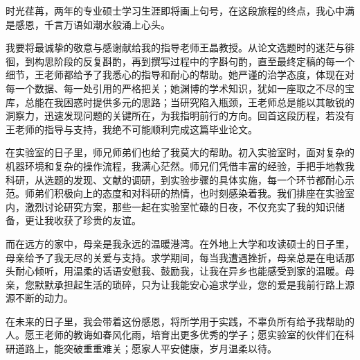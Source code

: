 \begin{acknowledge}%
时光荏苒，两年的专业硕士学习生涯即将画上句号，在这段旅程的终点，我心中满是感恩，千言万语如潮水般涌上心头。

我要将最诚挚的敬意与感谢献给我的指导老师王晶教授。从论文选题时的迷茫与徘徊，到构思阶段的反复斟酌，再到撰写过程中的字斟句酌，直至最终定稿的每一个细节，王老师都给予了我悉心的指导和耐心的帮助。她严谨的治学态度，体现在对每一个数据、每一处引用的严格把关；她渊博的学术知识，犹如一座取之不尽的宝库，总能在我困惑时提供多元的思路；当研究陷入瓶颈，王老师总是能以其敏锐的洞察力，迅速发现问题的关键所在，为我指明前行的方向。回首这段历程，若没有王老师的指导与支持，我绝不可能顺利完成这篇毕业论文。

在实验室的日子里，师兄师弟们也给了我莫大的帮助。初入实验室时，面对复杂的机器环境和复杂的操作流程，我满心茫然。师兄们凭借丰富的经验，手把手地教我科研，从选题的发现、文献的调研，到实验步骤的具体实施，每一个环节都耐心示范。师弟们积极向上的态度和对科研的热情，也时刻感染着我。我们排座在实验室内，激烈讨论研究方案，那些一起在实验室忙碌的日夜，不仅充实了我的知识储备，更让我收获了珍贵的友谊。

而在远方的家中，母亲是我永远的温暖港湾。在外地上大学和攻读硕士的日子里，母亲给予了我无尽的关爱与支持。求学期间，每当我遭遇挫折，母亲总是在电话那头耐心倾听，用温柔的话语安慰我、鼓励我，让我在异乡也能感受到家的温暖。母亲，您默默承担起生活的琐碎，只为让我能安心追求学业，您的爱是我前行路上源源不断的动力。

在未来的日子里，我会带着这份感恩，将所学用于实践，不辜负所有给予我帮助的人。愿王老师的教诲如春风化雨，培育出更多优秀的学子；愿实验室的伙伴们在科研道路上，能突破重重难关；愿家人平安健康，岁月温柔以待。
    
\end{acknowledge}
